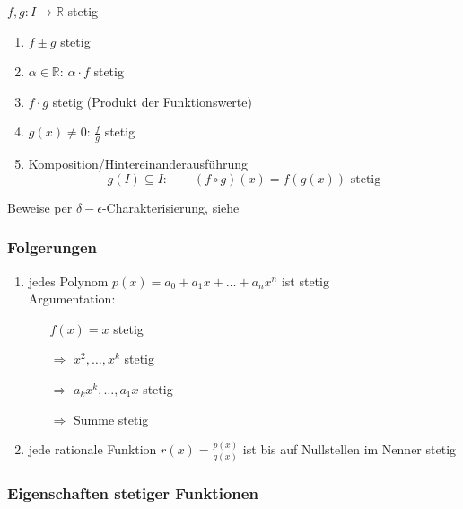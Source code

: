 $f, g: I \to \mathbb{R}$ stetig

\begin{enumerate}
  \item $f\pm g$ stetig
  \item $\alpha \in \mathbb{R}$: $\alpha \cdot f$ stetig
  \item $f \cdot g$ stetig (Produkt der Funktionswerte)
  \item $g(x) \neq 0$: $\frac f g$ stetig
  \item Komposition/Hintereinanderausführung
    \begin{equation*}
      g(I) \subseteq I: \qquad (f \circ g)(x) = f(g(x)) \text{ stetig}
    \end{equation*}
\end{enumerate}
%
Beweise per $\delta-\epsilon$-Charakterisierung, siehe \cite{bornemann}

\subsubsection*{Folgerungen}

  \begin{enumerate}
    \item jedes Polynom $p(x) = a_0 + a_1 x + \ldots + a_n x^n$ ist stetig\\
      Argumentation:
      \begin{itemize}
        \item[] $f(x) = x$ stetig
        \item[$\Rightarrow$] $x^2, \ldots, x^k$ stetig
        \item[$\Rightarrow$] $a_k x^k, \ldots, a_1 x$ stetig
        \item[$\Rightarrow$] Summe stetig
      \end{itemize}
    \item jede rationale Funktion $r(x) = \frac{p(x)}{q(x)}$ ist bis auf Nullstellen im Nenner stetig
  \end{enumerate}

\subsubsection*{Eigenschaften stetiger Funktionen}

